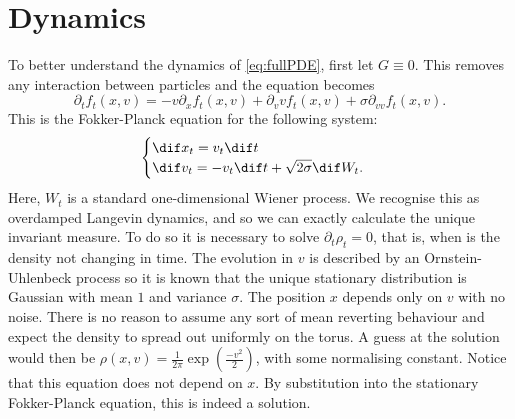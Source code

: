 \documentclass[11pt, a4pape draft]{article}
\begin{document}
		\section{Dynamics}\label{sec:dynamics}
		To better understand the dynamics of \eqref{eq:fullPDE}, first let $G\equiv0$. This removes any interaction between particles and the equation becomes
		\begin{equation}\label{eq:OU_FPE}
			\partial_t f_t(x,v) = -v\partial_x f_t(x,v) +\partial_v vf_t(x,v) + \sigma \partial_{vv}f_t(x,v).
		\end{equation}
		This is the Fokker-Planck equation for the following system:
		\begin{equation}\label{eq:2d_OU}\begin{cases}
			\dif x_t = v_t\dif t\\
			\dif v_t = -v_t\dif t + \sqrt{2\sigma} \dif W_t. 
		\end{cases}	\end{equation}
		Here, $W_t$ is a standard one-dimensional Wiener process. We recognise this as overdamped Langevin dynamics, and so we can exactly calculate the unique invariant measure. To do so it is necessary to solve $\partial_t \rho_t = 0$, that is, when is the density not changing in time. The evolution in $v$ is described by an Ornstein-Uhlenbeck process so it is known that the unique stationary distribution is Gaussian with mean $1$ and variance $\sigma$. The position $x$ depends only on $v$ with no noise. There is no reason to assume any sort of mean reverting behaviour and expect the density to spread out uniformly on the torus. A guess at the solution would then be $\rho (x,v) = \frac{1}{2\pi}\exp(\frac{-v^2}{2})$, with some normalising constant. Notice that this equation does not depend on $x$. By substitution into the stationary Fokker-Planck equation, this is indeed a solution.
        
\end{document}
